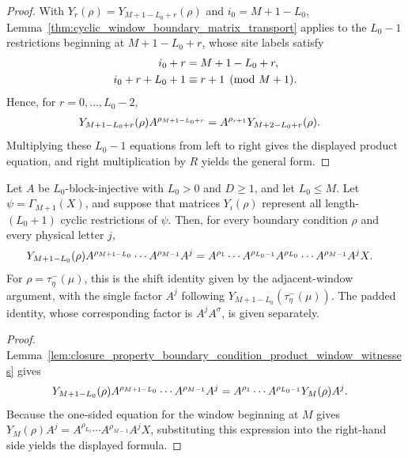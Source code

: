 \begin{proof}
    \leanok
    With $Y_r(\rho)=Y_{M+1-L_0+r}(\rho)$ and $i_0=M+1-L_0$,
    Lemma~\ref{thm:cyclic_window_boundary_matrix_transport} applies to the
    $L_0-1$ restrictions beginning at $M+1-L_0+r$, whose site labels satisfy
    \begin{align}
        i_0+r       & =M+1-L_0+r, \notag           \\
        i_0+r+L_0+1 & \equiv r+1\pmod{M+1}. \notag
    \end{align}
    Hence, for $r=0,\ldots,L_0-2$,
    \begin{align}
        Y_{M+1-L_0+r}(\rho)A^{\rho_{M+1-L_0+r}}
         & =A^{\rho_{r+1}}Y_{M+2-L_0+r}(\rho). \notag
    \end{align}
    Multiplying these $L_0-1$ equations from left to right gives the displayed
    product equation, and right multiplication by $R$ yields the general form.
\end{proof}

\begin{lemma}
    \label{lem:boundary_transport_wrapped_product_ground_space_map}
    \leanok
    Let $A$ be $L_0$-block-injective with $L_0>0$ and $D\ge1$, and let
    $L_0\le M$. Let $\psi=\Gamma_{M+1}(X)$, and suppose that matrices
    $Y_i(\rho)$ represent all length-$(L_0+1)$ cyclic restrictions of $\psi$.
    Then, for every boundary condition $\rho$ and every physical letter $j$,
    \begin{align}
         & Y_{M+1-L_0}(\rho)
        A^{\rho_{M+1-L_0}}\cdots A^{\rho_{M-1}}A^j =A^{\rho_1}\cdots A^{\rho_{L_0-1}}
        A^{\rho_{L_0}}\cdots A^{\rho_{M-1}}A^jX. \notag
    \end{align}
    For $\rho=\tau^-_\eta(\mu)$, this is the shift identity given by the
    adjacent-window argument, with the single factor $A^j$ following
    $Y_{M+1-L_0}(\tau^-_\eta(\mu))$. The padded identity, whose corresponding
    factor is $A^jA^\sigma$, is given separately.
\end{lemma}

\begin{proof}
    \leanok
    Lemma~\ref{lem:closure_property_boundary_condition_product_window_witnesses}
    gives
    \begin{align}
         & Y_{M+1-L_0}(\rho)
        A^{\rho_{M+1-L_0}}\cdots A^{\rho_{M-1}}A^j =A^{\rho_1}\cdots A^{\rho_{L_0-1}}Y_M(\rho)A^j. \notag
    \end{align}
    Because the one-sided equation for the window beginning at $M$ gives
    $Y_M(\rho)A^j =A^{\rho_{L_0}}\cdots A^{\rho_{M-1}}A^jX$, substituting this
    expression into the right-hand side yields the displayed formula.
\end{proof}

